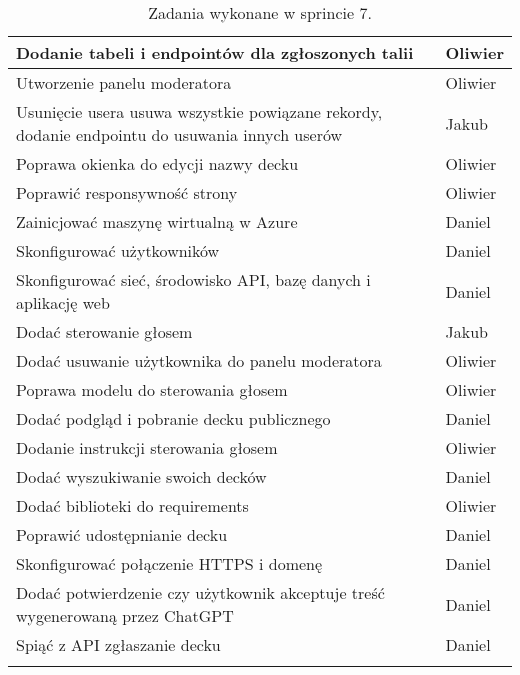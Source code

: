 \begin{longtable}{|p{}|p{}|}
    \hline
    [BACKEND] Dodanie tabeli i endpointów dla zgłoszonych talii & Oliwier \\
    \hline
    [WEB] Utworzenie panelu moderatora & Oliwier \\
    \hline
    [BACKEND] Usunięcie usera usuwa wszystkie powiązane rekordy, dodanie endpointu do usuwania innych userów & Jakub \\
    \hline
    [WEB] Poprawa okienka do edycji nazwy decku & Oliwier \\
    \hline
    [WEB] Poprawić responsywność strony & Oliwier \\
    \hline
    [SERWER] Zainicjować maszynę wirtualną w Azure & Daniel \\
    \hline
    [SERWER] Skonfigurować użytkowników & Daniel \\
    \hline
    [SERWER] Skonfigurować sieć, środowisko API, bazę danych i aplikację web & Daniel \\
    \hline
    [MOBILE] Dodać sterowanie głosem & Jakub \\
    \hline
    [WEB] Dodać usuwanie użytkownika do panelu moderatora & Oliwier \\
    \hline
    [BACKEND] Poprawa modelu do sterowania głosem & Oliwier \\
    \hline
    [MOBILE] Dodać podgląd i pobranie decku publicznego & Daniel \\
    \hline
    [WEB] Dodanie instrukcji sterowania głosem & Oliwier \\
    \hline
    [MOBILE] Dodać wyszukiwanie swoich decków & Daniel \\
    \hline
    [BACKEND] Dodać biblioteki do requirements & Oliwier \\
    \hline
    [MOBILE] Poprawić udostępnianie decku & Daniel \\
    \hline
    [SERWER] Skonfigurować połączenie HTTPS i domenę & Daniel \\
    \hline
    [MOBILE] Dodać potwierdzenie czy użytkownik akceptuje treść wygenerowaną przez ChatGPT & Daniel \\
    \hline
    [MOBILE] Spiąć z API zgłaszanie decku & Daniel \\
    \hline
                        \caption{Zadania wykonane w sprincie 7.}
\end{longtable}

